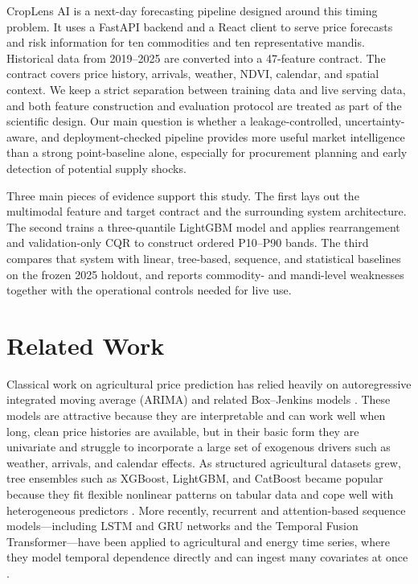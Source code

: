 \documentclass[a4paper,conference]{IEEEtran}
\begin{document}
CropLens AI is a next-day forecasting pipeline designed around this timing problem. It uses a FastAPI backend and a React client to serve price forecasts and risk information for ten commodities and ten representative mandis. Historical data from 2019--2025 are converted into a 47-feature contract. The contract covers price history, arrivals, weather, NDVI, calendar, and spatial context. We keep a strict separation between training data and live serving data, and both feature construction and evaluation protocol are treated as part of the scientific design. Our main question is whether a leakage-controlled, uncertainty-aware, and deployment-checked pipeline provides more useful market intelligence than a strong point-baseline alone, especially for procurement planning and early detection of potential supply shocks.

Three main pieces of evidence support this study. The first lays out the multimodal feature and target contract and the surrounding system architecture. The second trains a three-quantile LightGBM model and applies rearrangement and validation-only CQR to construct ordered P10--P90 bands. The third compares that system with linear, tree-based, sequence, and statistical baselines on the frozen 2025 holdout, and reports commodity- and mandi-level weaknesses together with the operational controls needed for live use.

\section{Related Work}
Classical work on agricultural price prediction has relied heavily on autoregressive integrated moving average (ARIMA) and related Box--Jenkins models \cite{box2015time}. These models are attractive because they are interpretable and can work well when long, clean price histories are available, but in their basic form they are univariate and struggle to incorporate a large set of exogenous drivers such as weather, arrivals, and calendar effects. As structured agricultural datasets grew, tree ensembles such as XGBoost, LightGBM, and CatBoost became popular because they fit flexible nonlinear patterns on tabular data and cope well with heterogeneous predictors \cite{chen2016xgboost,ke2017lightgbm,prokhorenkova2018catboost}. More recently, recurrent and attention-based sequence models---including LSTM and GRU networks and the Temporal Fusion Transformer---have been applied to agricultural and energy time series, where they model temporal dependence directly and can ingest many covariates at once \cite{hochreiter1997long,cho2014learning,lim2021temporal}.
\end{document}
